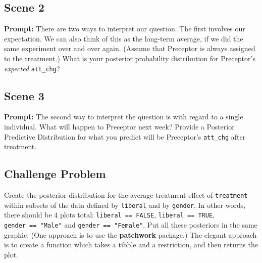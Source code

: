 \documentclass[
]{article}
\begin{document}
\hypertarget{scene-2}{%
\subsection{Scene 2}\label{scene-2}}

\textbf{Prompt:} There are two ways to interpret our question. The first
involves our expectation. We can also think of this as the long-term
average, if we did the same experiment over and over again. (Assume that
Preceptor is always assigned to the treatment.) What is your posterior
probability distribution for Preceptor's \emph{expected}
\texttt{att\_chg}?

\hypertarget{scene-3}{%
\subsection{Scene 3}\label{scene-3}}

\textbf{Prompt:} The second way to interpret the question is with regard
to a single individual. What will happen to Preceptor next week? Provide
a Posterior Predictive Distribution for what you predict will be
Preceptor's \texttt{att\_chg} after treatment.

\hypertarget{challenge-problem}{%
\subsection{Challenge Problem}\label{challenge-problem}}

Create the posterior distribution for the average treatment effect of
\texttt{treatment} within subsets of the data defined by
\texttt{liberal} and by \texttt{gender}. In other words, there should be
4 plots total: \texttt{liberal\ ==\ FALSE}, \texttt{liberal\ ==\ TRUE},
\texttt{gender\ ==\ "Male"} and \texttt{gender\ ==\ "Female"}. Put all
these posteriors in the same graphic. (One approach is to use the
\textbf{patchwork} package.) The elegant approach is to create a
function which takes a tibble and a restriction, and then returns the
plot.
\end{document}
